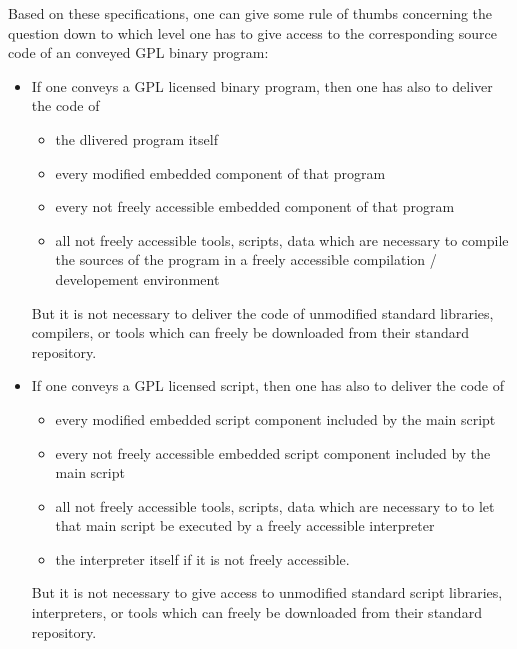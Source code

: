 Based on these specifications, one can give some rule of thumbs concerning the
question down to which level one has to give access to the corresponding source
code of an conveyed GPL binary program:
\begin{itemize}
  \item If one conveys a GPL licensed binary program, then one has
  also to deliver the code of
  \begin{itemize}
  \item the dlivered program itself
  \item every modified embedded component of that program
  \item every not freely accessible embedded component of that program
  \item all not freely accessible tools, scripts, data which are necessary to
  compile the sources of the program in a freely accessible compilation /
  developement environment
  \end{itemize}
  But it is not necessary to deliver the code of unmodified standard libraries,
  compilers, or tools which can freely be downloaded from their standard
  repository.
  \item If one conveys a GPL licensed script, then one has also to deliver the
  code of
  \begin{itemize}
  \item every modified embedded script component included by the main script
  \item every not freely accessible embedded script component included by the main script
  \item all not freely accessible tools, scripts, data which are necessary to
  to let that main script be executed by a freely accessible interpreter
  \item the interpreter itself if it is not freely accessible.
  \end{itemize}
  But it is not necessary to give access to unmodified standard script
  libraries, interpreters, or tools which can freely be downloaded from their
  standard repository.
\end{itemize}


  
%

